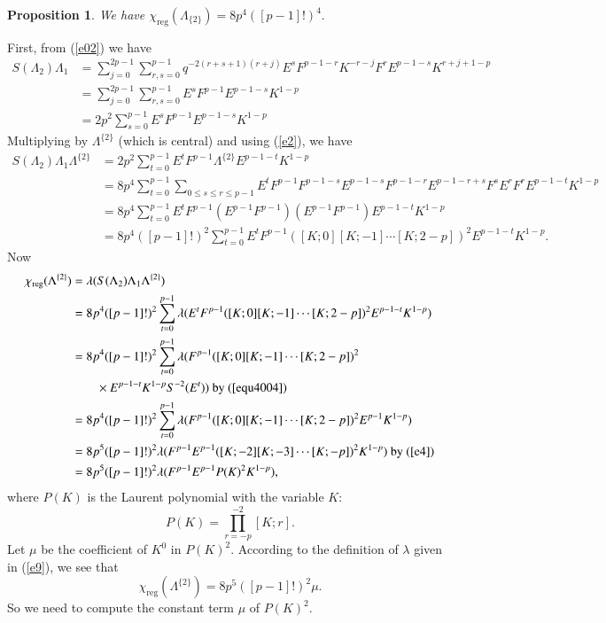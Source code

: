 \documentclass[11pt]{amsart}
\newtheorem{prop}[thm]{Proposition}
\numberwithin{equation}{section}
\begin{document}
\begin{prop}We have
$
\chi_{\operatorname{reg}}(\Lambda_{\{2\}}) = 8p^4([p-1]!)^4.
$
\end{prop}
\proof
First, from (\ref{e02}) we have
\begin{align*}
S(\Lambda_2)\Lambda_1&=\sum_{j=0}^{2p-1}\sum_{r,s=0}^{p-1}q^{-2(r+s+1)(r+j)}E^sF^{p-1-r}K^{-r-j}F^{r}E^{p-1-s}K^{r+j+1-p}\\
&=\sum_{j=0}^{2p-1}\sum_{r,s=0}^{p-1}E^sF^{p-1}E^{p-1-s}K^{1-p}\\
&=2p^2\sum_{s=0}^{p-1}E^sF^{p-1}E^{p-1-s}K^{1-p}
\end{align*}
Multiplying by $\Lambda^{\{2\}}$ (which is central) and using (\ref{e2}), we have
\begin{align*}
S(\Lambda_2)\Lambda_1\Lambda^{\{2\}}
&=2p^2\sum_{t=0}^{p-1}E^tF^{p-1}\Lambda^{\{2\}}E^{p-1-t}K^{1-p}\\
&=8p^4\sum_{t=0}^{p-1}\sum_{0\leq s\leq r \leq p-1}E^tF^{p-1}F^{p-1-s}E^{p-1-s}F^{p-1-r}E^{p-1-r+s}F^sE^rF^rE^{p-1-t}K^{1-p}\\
&=8p^4\sum_{t=0}^{p-1}E^tF^{p-1}(E^{p-1}F^{p-1})(E^{p-1}F^{p-1})E^{p-1-t}K^{1-p}\\
&=8p^4([p-1]!)^2\sum_{t=0}^{p-1}E^tF^{p-1}([K;0][K;-1]\cdots[K;2-p])^2E^{p-1-t}K^{1-p}.
\end{align*}
Now
\begin{align*}
\chi_{\operatorname{reg}}(\Lambda^{\{2\}})&=\lambda(S(\Lambda_2)\Lambda_1\Lambda^{\{2\}})\\
&=8p^4([p-1]!)^2\sum_{t=0}^{p-1}\lambda(E^tF^{p-1}([K;0][K;-1]\cdots[K;2-p])^2E^{p-1-t}K^{1-p})\\
&=8p^4([p-1]!)^2\sum_{t=0}^{p-1}\lambda(F^{p-1}([K;0][K;-1]\cdots[K;2-p])^2\\
&\qquad \times  E^{p-1-t}K^{1-p}S^{-2}(E^t))\ \text{by}\ (\ref{equ4004})\\
&=8p^4([p-1]!)^2\sum_{t=0}^{p-1}\lambda(F^{p-1}([K;0][K;-1]\cdots[K;2-p])^2E^{p-1}K^{1-p})\\
&=8p^5([p-1]!)^2\lambda(F^{p-1}E^{p-1}([K;-2][K;-3]\cdots[K;-p])^2K^{1-p})\ \text{by}\ (\ref{e4})\\
&=8p^5([p-1]!)^2\lambda(F^{p-1}E^{p-1}P(K)^2K^{1-p}),
\end{align*}
where $P(K)$ is the Laurent polynomial with the variable $K$:
\[
P(K)=\prod_{r=-p}^{-2}[K;r].
\]
Let $\mu$ be the coefficient of \(K^0\) in \(P(K)^2\). According to the definition of $\lambda$ given in (\ref{e9}), we see that $$\chi_{\operatorname{reg}}(\Lambda^{\{2\}})=8p^5([p-1]!)^2\mu.$$
So we need to compute the constant term $\mu$ of \(P(K)^2\).
\end{document}

